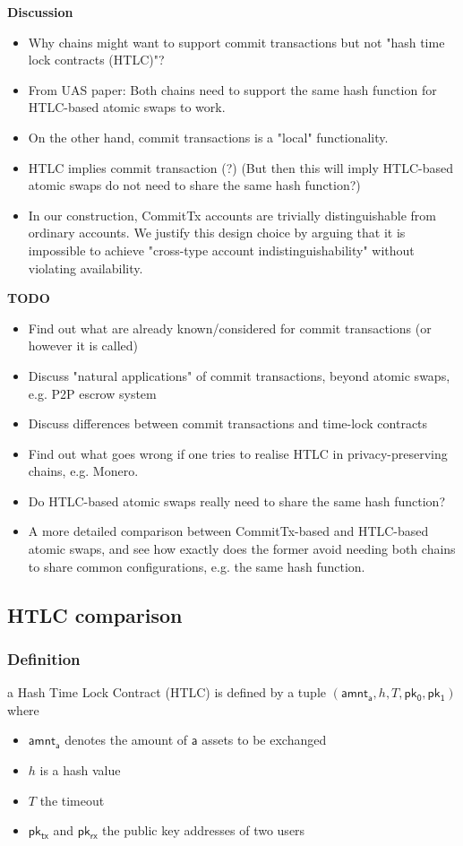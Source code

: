 \documentclass{article}      	%
\begin{document}
\begin{todobox}
\textbf{Discussion}
\begin{itemize}
    \item Why chains might want to support commit transactions but not "hash time lock contracts (HTLC)"? 
    \item From UAS paper: Both chains need to support the same hash function for HTLC-based atomic swaps to work. 
    \item On the other hand, commit transactions is a "local" functionality. 
    \item HTLC implies commit transaction (?) (But then this will imply HTLC-based atomic swaps do not need to share the same hash function?)
    \item In our construction, CommitTx accounts are trivially distinguishable from ordinary accounts. We justify this design choice by arguing that it is impossible to achieve "cross-type account indistinguishability" without violating availability.
\end{itemize}
\textbf{TODO}
\begin{itemize}
    \item Find out what are already known/considered for commit transactions (or however it is called)
    \item Discuss "natural applications" of commit transactions, beyond atomic swaps, e.g. P2P escrow system 
    \item Discuss differences between commit transactions and time-lock contracts  
    \item Find out what goes wrong if one tries to realise HTLC in privacy-preserving chains, e.g. Monero.
    \item Do HTLC-based atomic swaps really need to share the same hash function?
    \item A more detailed comparison between CommitTx-based and HTLC-based atomic swaps, and see how exactly does the former avoid needing both chains to share common configurations, e.g. the same hash function.
\end{itemize}
\end{todobox}

\subsection{HTLC comparison}

\subsubsection{Definition}
a Hash Time Lock Contract (HTLC) is defined by a tuple $(\mathsf{amnt_a}, h, T, \mathsf{pk_0}, \mathsf{pk_1})$ where 
\begin{itemize}
	\item $\mathsf{amnt_a}$ denotes the amount of $\mathsf{a}$ assets to be exchanged
	\item $h$ is a hash value
	\item $T$ the timeout
	\item $\mathsf{pk_{tx}}$ and $\mathsf{pk_{rx}}$ the public key addresses of two users
\end{itemize}
\end{document}
